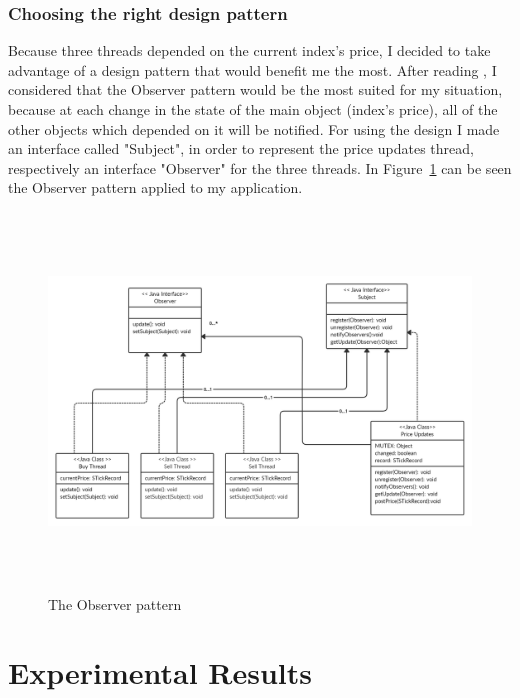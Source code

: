 \documentclass[12pt,a4paper]{report}
\begin{document}
\subsection{Choosing the right design pattern}
Because three threads depended on the current index's price, I decided to take advantage of a design pattern that would benefit me the most. After reading \cite{patterns}, I considered that the Observer pattern would be the most suited for my situation, because at each change in the state of the main object (index's price), all of the other objects which depended on it will be notified. For using the design I made an interface called "Subject", in order to represent the price updates thread, respectively an interface "Observer" for the three threads. In Figure~\ref{fig:observer} can be seen the Observer pattern applied to my application.
\begin{figure}[!ht]
	\centering
	\includegraphics[width=16cm,height=10cm]{pics/observer.png}
	\caption{The Observer pattern}
	\label{fig:observer}
\end{figure}

\chapter{Experimental Results}
\end{document}
